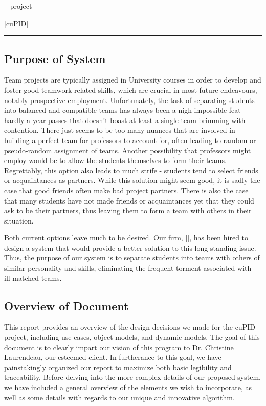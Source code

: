\documentclass[12pt,letterpaper]{article}
\begin{document}
\begin{center}
    -- project --
\end{center}

\begin{center}
	\Huge [cuPID]
\end{center}

\begin{center}
    \rule{0.85\textwidth}{0.5pt}
\end{center}

\subsection{Purpose of System}

Team projects are typically assigned in University courses in order to develop and foster
good teamwork related skills, which are crucial in most future endeavours, notably 
prospective employment. Unfortunately, the task of separating students into balanced 
and compatible teams has always been a nigh impossible feat - hardly a year passes that doesn't
boast at least a single team brimming with  contention. There just seems to be too many
nuances that are involved in building a perfect team for professors to account for, often leading
to random or pseudo-random assignment of teams. Another possibility that professors might employ
would be to allow the students themselves to form their teams. Regrettably, this option also
leads to much strife - students tend to select friends or acquaintances as partners. While this
solution might seem good, it is sadly the case that good friends often make bad project partners. 
There is also the case that many students have not made friends or acquaintances yet that they 
could ask to be their partners, thus leaving them to form a team with others in their situation.

Both current options leave much to be desired. Our firm, [\teamname{}], has been hired
to design a system that would provide a better solution to this long-standing issue. Thus, the purpose of
our system is to separate students into teams with others of similar personality and skills, eliminating 
the frequent torment associated with ill-matched teams.

\subsection{Overview of Document}

This report provides an overview of the design decisions we made for the cuPID project, including 
use cases, object models, and dynamic models. The goal of this document is to clearly impart our vision of this
program to Dr. Christine Laurendeau, our esteemed client. In furtherance to this goal, we have painstakingly 
organized our report to maximize both basic legibility and traceability. Before delving into the more complex details 
of our proposed system, we have included a general overview of the elements we wish to incorporate, as well as 
some details with regards to our unique and innovative algorithm.
\end{document}
